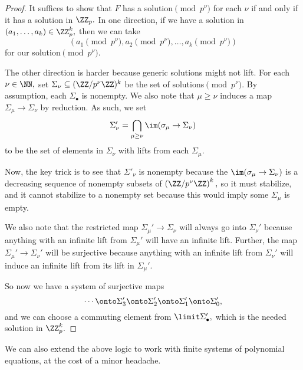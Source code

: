 \begin{proof}
	It suffices to show that $F$ has a solution$\pmod{p^\nu}$ for each $\nu$ if and only if it has a solution in $\ZZ_p.$ In one direction, if we have a solution in $(a_1,\ldots,a_k)\in\ZZ_p^k,$ then we can take
	\[(a_1\pmod{p^\nu},a_2\pmod{p^\nu},\ldots,a_k\pmod{p^\nu})\]
	for our solution$\pmod{p^\nu}.$

	The other direction is harder because generic solutions might not lift. For each $\nu\in\NN,$ set $\Sigma_\nu\subseteq(\ZZ/p^\nu\ZZ)^k$ be the set of solutions$\pmod{p^\nu}.$ By assumption, each $\Sigma_\bullet$ is nonempty. We also note that $\mu\ge\nu$ induces a map $\Sigma_\mu\to\Sigma_\nu$ by reduction. As such, we set
	\[\Sigma'_\nu=\bigcap_{\mu\ge\nu}\im(\sigma_\mu\to\Sigma_\nu)\]
	to be the set of elements in $\Sigma_\nu$ with lifts from each $\Sigma_\mu.$
	
	Now, the key trick is to see that $\Sigma'_\nu$ is nonempty because the $\im(\sigma_\mu\to\Sigma_\nu)$ is a decreasing sequence of nonempty subsets of $\left(\ZZ/p^\nu\ZZ\right)^k,$ so it must stabilize, and it cannot stabilize to a nonempty set because this would imply some $\Sigma_\mu$ is empty.

	We also note that the restricted map $\Sigma_\mu'\to\Sigma_\nu$ will always go into $\Sigma_\nu'$ because anything with an infinite lift from $\Sigma_\mu'$ will have an infinite lift. Further, the map $\Sigma_\mu'\to\Sigma_\nu'$ will be surjective because anything with an infinite lift from $\Sigma_\nu'$ will induce an infinite lift from its lift in $\Sigma_\mu'.$

	So now we have a system of surjective maps
	\[\cdots\onto\Sigma_3'\onto\Sigma_2'\onto\Sigma_1'\onto\Sigma_0',\]
	and we can choose a commuting element from $\limit\Sigma_\bullet',$ which is the needed solution in $\ZZ_p^k.$
\end{proof}
\begin{remark}
	We can also extend the above logic to work with finite systems of polynomial equations, at the cost of a minor headache.
\end{remark}

